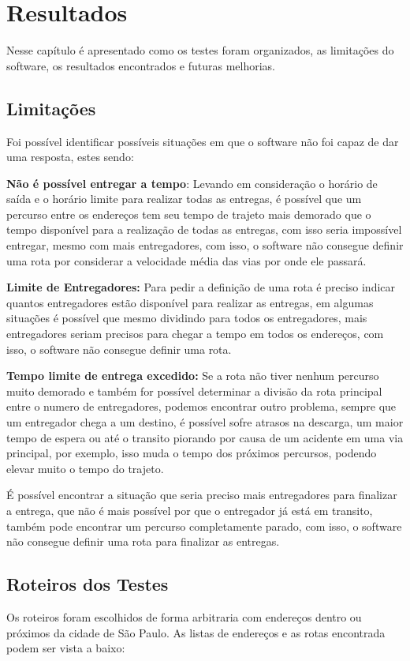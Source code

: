 \chapter{Resultados}
Nesse capítulo é apresentado como os testes foram organizados, as limitações do software, os resultados encontrados e futuras melhorias.

\section{Limitações}
Foi possível identificar possíveis situações em que o software não foi capaz de dar uma resposta, estes sendo:

\textbf{Não é possível entregar a tempo}: Levando em consideração o horário de saída e o horário limite para realizar todas as entregas, é possível que um percurso entre os endereços tem seu tempo de trajeto mais demorado que o tempo disponível para a realização de todas as entregas, com isso seria impossível entregar, mesmo com mais entregadores, com isso, o software não consegue definir uma rota por considerar a velocidade média das vias por onde ele passará.

\textbf{Limite de Entregadores:} Para pedir a definição de uma rota é preciso indicar quantos entregadores estão disponível para realizar as entregas, em algumas situações é possível que mesmo dividindo para todos os entregadores, mais entregadores seriam precisos para chegar a tempo em todos os endereços, com isso, o software não consegue definir uma rota.

\textbf{Tempo limite de entrega excedido:} Se a rota não tiver nenhum percurso muito demorado e também for possível determinar a divisão da rota principal entre o numero de entregadores, podemos encontrar outro problema, sempre que um entregador chega a um destino, é possível sofre atrasos na descarga, um maior tempo de espera ou até o transito piorando por causa de um acidente em uma via principal, por exemplo, isso muda o tempo dos próximos percursos, podendo elevar muito o tempo do trajeto.

É possível encontrar a situação que seria preciso mais entregadores para finalizar a entrega, que não é mais possível por que o entregador já está em transito, também pode encontrar um percurso completamente parado,  com isso, o software não consegue definir uma rota para finalizar as entregas.

\pagebreak
\section{Roteiros dos Testes}
Os roteiros foram escolhidos de forma arbitraria com endereços dentro ou próximos da cidade de São Paulo. As listas de endereços e as rotas encontrada podem ser vista a baixo:


